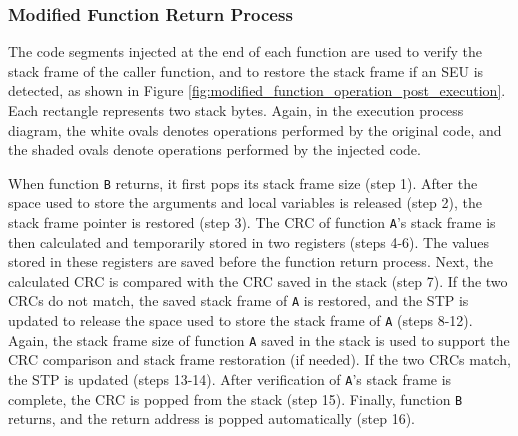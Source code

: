 \subsubsection{Modified Function Return Process}
\vspace{-5pt}
The code segments injected at the end of each function are used to verify the stack frame of the caller function, and to restore the stack frame if an SEU is detected, as shown in Figure \ref{fig:modified_function_operation_post_execution}. Each rectangle represents two stack bytes. Again, in the execution process diagram, the white ovals denotes operations performed by the original code, and the shaded ovals denote operations performed by the injected code.%

When function \texttt{B} returns, it first pops its stack frame size (step 1). After the space used to store the arguments and local variables is released (step 2), the stack frame pointer is restored (step 3). The CRC of function \texttt{A}'s stack frame is then calculated and temporarily stored in two registers (steps 4-6). The values stored in these registers are saved before the function return process. Next, the calculated CRC is compared with the CRC saved in the stack (step 7). If the two CRCs do not match, the saved stack frame of \texttt{A} is restored, and the STP is updated to release the space used to store the stack frame of \texttt{A} (steps 8-12). Again, the stack frame size of function \texttt{A} saved in the stack is used to support the CRC comparison and stack frame restoration (if needed). If the two CRCs match, the STP is updated (steps 13-14). After verification of \texttt{A}'s stack frame is complete, the CRC is popped from the stack (step 15). Finally, function \texttt{B} returns, and the return address is popped automatically (step 16).


